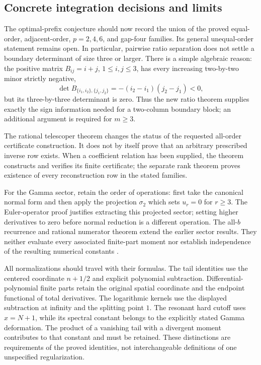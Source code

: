 \documentclass[11pt,letterpaper]{article}
\numberwithin{equation}{section}
\theoremstyle{plain}
\theoremstyle{definition}
\theoremstyle{remark}
\begin{document}
\subsection{Concrete integration decisions and limits}
\label{audit:decisions}

The optimal-prefix conjecture should now record the union of the
proved equal-order, adjacent-order, $p=2,4,6$, and gap-four families.
Its general unequal-order statement remains open. In particular,
pairwise ratio separation does not settle a boundary determinant of
size three or larger. There is a simple algebraic reason: the positive
matrix $B_{ij}=i+j$, $1\le i,j\le3$, has every increasing
two-by-two minor strictly negative,
\[
 \det B_{\{i_1,i_2\},\{j_1,j_2\}}
       =-(i_2-i_1)(j_2-j_1)<0,
\]
but its three-by-three determinant is zero. Thus the new ratio theorem
supplies exactly the sign information needed for a two-column
boundary block; an additional argument is required for $m\ge3$.

The rational telescoper theorem changes the status of the requested
all-order certificate construction. It does not by itself prove that
an arbitrary prescribed inverse row exists. When a coefficient relation
has been supplied, the theorem constructs and verifies its finite
certificate; the separate rank theorem proves existence of every
reconstruction row in the stated families.

For the Gamma sector, retain the order of operations: first take the
canonical normal form and then apply the projection $\sigma_2$ which
sets $u_r=0$ for $r\ge3$. The Euler-operator proof justifies extracting
this projected sector; setting higher derivatives to zero before
normal reduction is a different operation. The all-$b$ recurrence and
rational numerator theorem extend the earlier sector results. They
neither evaluate every associated finite-part moment nor establish
independence of the resulting numerical constants \cite{DPL,PTI}.

All normalizations should travel with their formulas. The tail
identities use the centered coordinate $n+1/2$ and explicit polynomial
subtraction. Differential-polynomial finite parts retain the original
spatial coordinate and the endpoint functional of total derivatives.
The logarithmic kernels use the displayed subtraction at infinity and
the splitting point $1$. The resonant hard cutoff uses $x=N+1$, while
its spectral constant belongs to the explicitly stated Gamma
deformation. The product of a vanishing tail with a divergent moment
contributes to that constant and must be retained. These distinctions
are requirements of the proved identities, not interchangeable
definitions of one unspecified regularization.
\end{document}
